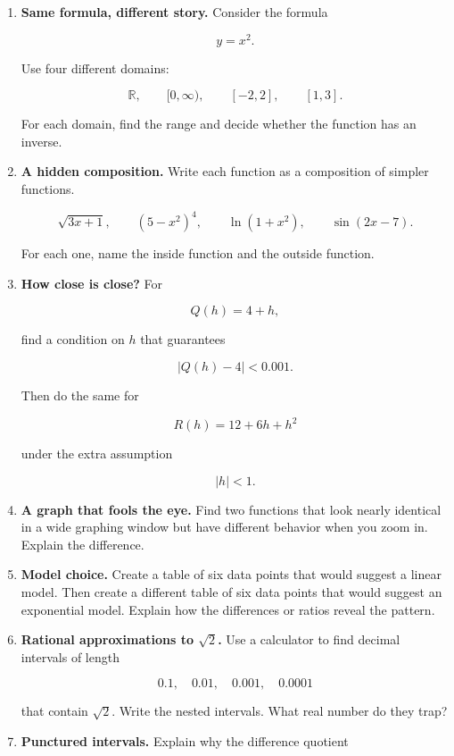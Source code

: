 \begin{enumerate}
\item \textbf{Same formula, different story.}
Consider the formula

\[
y=x^2.
\]

Use four different domains:

\[
\mathbb R,\qquad [0,\infty),\qquad [-2,2],\qquad [1,3].
\]

For each domain, find the range and decide whether the function has an inverse.

\item \textbf{A hidden composition.}
Write each function as a composition of simpler functions.

\[
\sqrt{3x+1},
\qquad
(5-x^2)^4,
\qquad
\ln(1+x^2),
\qquad
\sin(2x-7).
\]

For each one, name the inside function and the outside function.

\item \textbf{How close is close?}
For

\[
Q(h)=4+h,
\]

find a condition on \(h\) that guarantees

\[
|Q(h)-4|<0.001.
\]

Then do the same for

\[
R(h)=12+6h+h^2
\]

under the extra assumption

\[
|h|<1.
\]

\item \textbf{A graph that fools the eye.}
Find two functions that look nearly identical in a wide graphing window but have different behavior when you zoom in. Explain the difference.

\item \textbf{Model choice.}
Create a table of six data points that would suggest a linear model. Then create a different table of six data points that would suggest an exponential model. Explain how the differences or ratios reveal the pattern.

\item \textbf{Rational approximations to \(\sqrt2\).}
Use a calculator to find decimal intervals of length

\[
0.1,\quad 0.01,\quad 0.001,\quad 0.0001
\]

that contain \(\sqrt2\). Write the nested intervals. What real number do they trap?

\item \textbf{Punctured intervals.}
Explain why the difference quotient


\end{enumerate}

